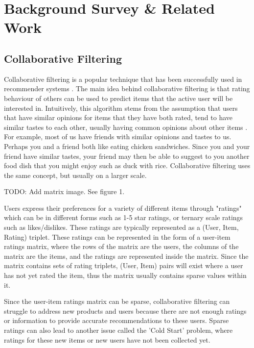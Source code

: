 \chapter{Background Survey \& Related Work}\label{C:background}

\section{Collaborative Filtering}

Collaborative filtering is a popular technique that has been successfully used in recommender systems \cite{itembased, schafer2007collaborative}. The main idea behind collaborative filtering is that rating behaviour of others can be used to predict items that the active user will be interested in. Intuitively, this algorithm stems from the assumption that users that have similar opinions for items that they have both rated, tend to have similar tastes to each other, usually having common opinions about other items  \cite{schafer2007collaborative}. For example, most of us have friends with similar opinions and tastes to us. Perhaps you and a friend both like eating chicken sandwiches. Since you and your friend have similar tastes, your friend may then be able to suggest to you another food dish that you might enjoy such as duck with rice. Collaborative filtering uses the same concept, but usually on a larger scale. 

TODO: Add matrix image. See figure 1.

Users express their preferences for a variety of different items through "ratings" which can be in different forms such as 1-5 star ratings, or ternary scale ratings such as likes/dislikes. These ratings are typically represented as a (User, Item, Rating) triplet. These ratings can be represented in the form of a user-item ratings matrix, where the rows of the matrix are the users, the columns of the matrix are the items, and the ratings are represented inside the matrix. Since the matrix contains sets of rating triplets, (User, Item) pairs will exist where a user has not yet rated the item, thus the matrix usually contains sparse values within it. 

Since the user-item ratings matrix can be sparse, collaborative filtering can struggle to address new products and users because there are not enough ratings or information to provide accurate recommendations to these users. Sparse ratings can also lead to another issue called the 'Cold Start' problem, where ratings for these new items or new users have not been collected yet.


